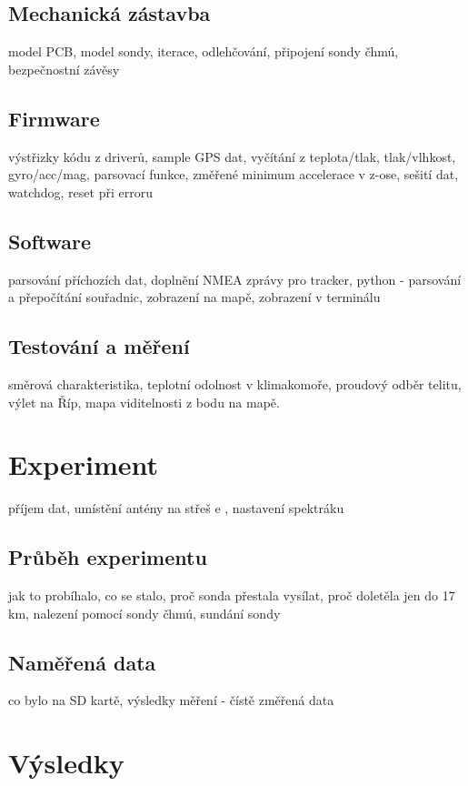 \documentclass[twoside]{ctuthesis}
\theoremstyle{plain}
\theoremstyle{definition}
\theoremstyle{note}
\begin{document}
	\section{Mechanická zástavba}
	model PCB, model sondy, iterace, odlehčování, připojení sondy čhmú, bezpečnostní závěsy

	\section{Firmware}
	výstřizky kódu z driverů, sample GPS dat, vyčítání z teplota/tlak, tlak/vlhkost, gyro/acc/mag, parsovací funkce, změřené minimum accelerace v z-ose, sešití dat, watchdog, reset při erroru

	\section{Software}
	parsování příchozích dat, doplnění NMEA zprávy pro tracker, python - parsování a přepočítání souřadnic, zobrazení na mapě, zobrazení v terminálu

	\section{Testování a měření}
	směrová charakteristika, teplotní odolnost v klimakomoře, proudový odběr telitu, výlet na Říp, mapa viditelnosti z bodu na mapě. 




\chapter{Experiment}
příjem dat, umístění antény na střeš e , nastavení spektráku
	\section{Průběh experimentu}
	jak to probíhalo, co se stalo, proč sonda přestala vysílat, proč doletěla jen do 17 km, nalezení pomocí sondy čhmú, sundání sondy

	\section{Naměřená data}
	co bylo na SD kartě, výsledky měření - čístě změřená data



\chapter{Výsledky}
\end{document}
